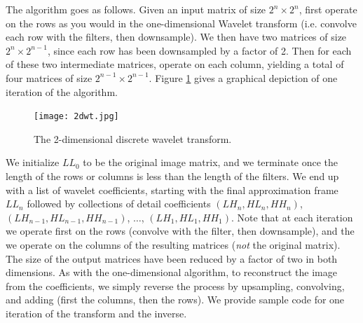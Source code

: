 The algorithm goes as follows.
Given an input matrix of size $2^n \times 2^n$, first operate on the rows as you would
in the one-dimensional Wavelet transform (i.e. convolve each row with the filters, then
downsample).
We then have two matrices of size $2^n \times 2^{n-1}$,
since each row has been downsampled by a factor of 2. Then for each of these two
intermediate matrices, operate on each column, yielding a total of four matrices of
size $2^{n-1} \times 2^{n-1}$. Figure \ref{fig:2dwt}
gives a graphical depiction of one iteration of the algorithm.

\begin{figure}[t]
    \texttt{[image: 2dwt.jpg]}
    \caption{The 2-dimensional discrete wavelet transform.}
    \label{fig:2dwt}
\end{figure}


We initialize $LL_0$ to be the
original image matrix, and we terminate once the length of the rows or columns
is less than the length of the filters. We end up with a list of wavelet
coefficients, starting with the final approximation frame $LL_n$ followed by
collections of detail coefficients $(LH_n,HL_n,HH_n)$, $(LH_{n-1},HL_{n-1},HH_{n-1})$,
$\ldots$, $(LH_1,HL_1,HH_1)$. Note that at each iteration we operate first on the
rows (convolve with the filter, then downsample), and the we operate on the columns
of the resulting matrices (\emph{not} the original matrix). The size of the output
matrices have been reduced by a factor of two in both dimensions. As with the
one-dimensional algorithm, to reconstruct the image from the coefficients, we simply
reverse the process by upsampling, convolving, and adding (first the columns, then
the rows). We provide sample code for one iteration of the transform and the inverse.

